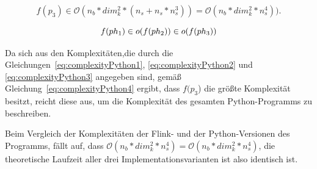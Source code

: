 \begin{equation} \label{eq:complexityPython3}
f(p_3) \in \mathcal{O}(n_b * dim_k^2 * (n_s + n_s * n_s^3)) = \mathcal{O}(n_b * dim_k^2 * n_s^4)).
\end{equation}

\begin{equation} \label{eq:complexityPython4}
f(ph_1) \in \mathnormal{o}(f(ph_2)) \in \mathnormal{o}(f(ph_3))
\end{equation}

Da sich aus den Komplexitäten,die durch die Gleichungen~\ref{eq:complexityPython1}, \ref{eq:complexityPython2} und \ref{eq:complexityPython3} angegeben sind, gemäß Gleichung~\ref{eq:complexityPython4} ergibt, dass $f(p_3$) die größte Komplexität besitzt, reicht diese aus, um die Komplexität des gesamten Python-Programms zu beschreiben.

Beim Vergleich der Komplexitäten der Flink- und der Python-Versionen des Programms, fällt auf, dass  $\mathcal{O}(n_b * dim_k^2 * n_s^4) = \mathcal{O}(n_b * dim_k^2 * n_s^4)$, die theoretische Laufzeit aller drei Implementationsvarianten ist also identisch ist.

